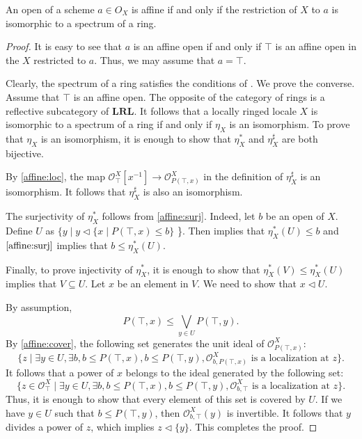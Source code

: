 \documentclass[reqno]{amsart}
\theoremstyle{definition}
\theoremstyle{remark}
\numberwithin{figure}{section}
\newcommand{\cover}{\triangleleft}
\newcommand{\cat}[1]{\mathbf{#1}}
\begin{document}
\begin{prop}
An open of a scheme $a \in O_X$ is affine if and only if the restriction of $X$ to $a$ is isomorphic to a spectrum of a ring.
\end{prop}
\begin{proof}
It is easy to see that $a$ is an affine open if and only if $\top$ is an affine open in the $X$ restricted to $a$.
Thus, we may assume that $a = \top$.

Clearly, the spectrum of a ring satisfies the conditions of .
We prove the converse.
Assume that $\top$ is an affine open.
The opposite of the category of rings is a reflective subcategory of $\cat{LRL}$.
It follows that a locally ringed locale $X$ is isomorphic to a spectrum of a ring if and only if $\eta_X$ is an isomorphism.
To prove that $\eta_X$ is an isomorphism, it is enough to show that $\eta_X^*$ and $\eta_X^\sharp$ are both bijective.

By \eqref{affine:loc}, the map $\mathcal{O}^X_\top[x^{-1}] \to \mathcal{O}^X_{P(\top,x)}$ in the definition of $\eta_X^\sharp$ is an isomorphism.
It follows that $\eta_X^\sharp$ is also an isomorphism.

The surjectivity of $\eta_X^*$ follows from \eqref{affine:surj}.
Indeed, let $b$ be an open of $X$.
Define $U$ as $\{ y \mid y \cover \{ x \mid P(\top,x) \leq b \}$ \}.
Then  implies that $\eta_X^*(U) \leq b$ and $\eqref{affine:surj}$ implies that $b \leq \eta_X^*(U)$.

Finally, to prove injectivity of $\eta_X^*$, it is enough to show that $\eta_X^*(V) \leq \eta_X^*(U)$ implies that $V \subseteq U$.
Let $x$ be an element in $V$.
We need to show that $x \cover U$.

By assumption,
\[ P(\top,x) \leq \bigvee_{y \in U} P(\top,y). \]
By \eqref{affine:cover}, the following set generates the unit ideal of $\mathcal{O}^X_{P(\top,x)}$:
\[ \{ z \mid \exists y \in U, \exists b, b \leq P(\top,x), b \leq P(\top,y), \mathcal{O}^X_{b,P(\top,x)} \text{ is a localization at } z \}. \]
It follows that a power of $x$ belongs to the ideal generated by the following set:
\[ \{ z \in \mathcal{O}^X_\top \mid \exists y \in U, \exists b, b \leq P(\top,x), b \leq P(\top,y), \mathcal{O}^X_{b,\top} \text{ is a localization at } z \}. \]
Thus, it is enough to show that every element of this set is covered by $U$.
If we have $y \in U$ such that $b \leq P(\top,y)$, then $\mathcal{O}^X_{b,\top}(y)$ is invertible.
It follows that $y$ divides a power of $z$, which implies $z \cover \{ y \}$.
This completes the proof.
\end{proof}
\end{document}
